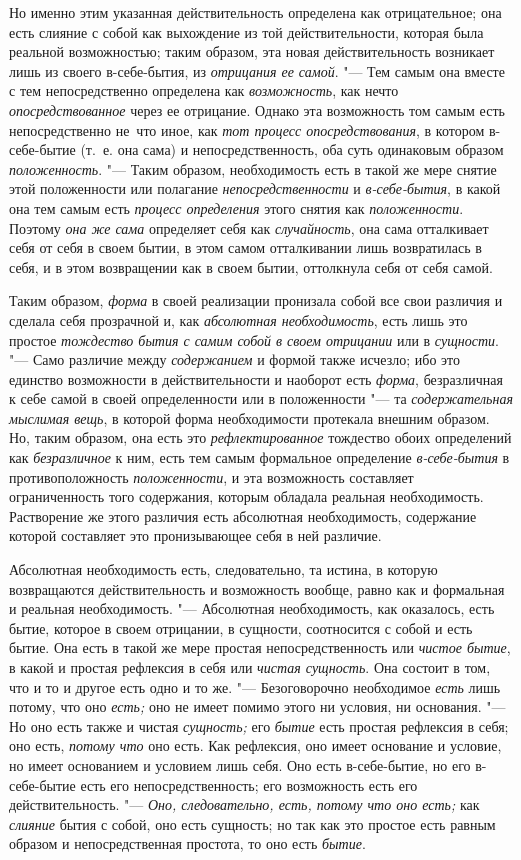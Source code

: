 Но именно этим указанная действительность определена как отрицательное; она
есть слияние с собой как выхождение из той действительности, которая была
реальной возможностью; таким образом, эта новая действительность возникает
лишь из своего в-себе-бытия, из {\em отрицания ее
самой}. "--- Тем самым она вместе с тем непосредственно определена как
{\em возможность}, как нечто
{\em опосредствованное} через ее отрицание. Однако эта
возможность том самым есть непосредственно не~что иное, как
{\em тот процесс опосредствования}, в котором
в-себе-бытие (т.~е. она сама) и непосредственность, оба суть одинаковым
образом {\em положенность}. "--- Таким образом,
необходимость есть в такой же мере снятие этой положенности или полагание
{\em непосредственности} и
{\em в-себе-бытия}, в какой она тем самым есть
{\em процесс определения} этого снятия как
{\em положенности}. Поэтому
{\em она же сама} определяет себя как
{\em случайность}, она сама отталкивает себя от себя в
своем бытии, в этом самом отталкивании лишь возвратилась в себя, и в этом
возвращении как в своем бытии, оттолкнула себя от себя самой.

Таким образом, {\em форма} в своей реализации пронизала
собой все свои различия и сделала себя прозрачной и, как
{\em абсолютная необходимость}, есть лишь это простое
{\em тождество бытия с самим собой в своем отрицании}
или в {\em сущности}. "--- Само различие между
{\em содержанием} и формой также исчезло; ибо это
единство возможности в действительности и наоборот есть
{\em форма}, безразличная к себе самой в своей
определенности или в положенности "--- та
{\em содержательная мыслимая вещь}, в которой форма
необходимости протекала внешним образом. Но, таким образом, она есть это
{\em рефлектированное} тождество обоих определений как
{\em безразличное} к ним, есть тем самым формальное
определение {\em в-себе-бытия} в противоположность
{\em положенности}, и эта возможность составляет
ограниченность того содержания, которым обладала реальная необходимость.
Растворение же этого различия есть абсолютная необходимость, содержание
которой составляет это пронизывающее себя в ней различие.

Абсолютная необходимость есть, следовательно, та истина, в которую
возвращаются действительность и возможность вообще, равно как и формальная
и реальная необходимость. "--- Абсолютная необходимость, как оказалось, есть
бытие, которое в своем отрицании, в сущности, соотносится с собой и есть
бытие. Она есть в такой же мере простая непосредственность или
{\em чистое бытие}, в какой и простая рефлексия в себя
или {\em чистая сущность}. Она состоит в том, что и то
и другое есть одно и то же. "--- Безоговорочно необходимое
{\em есть} лишь потому, что оно
{\em есть;} оно не имеет помимо этого ни условия, ни
основания. "--- Но оно есть также и чистая {\em сущность;}
его {\em бытие} есть простая рефлексия в себя; оно
есть, {\em потому что} оно есть. Как рефлексия, оно
имеет основание и условие, но имеет основанием и условием лишь себя. Оно
есть в-себе-бытие, но его в-себе-бытие есть его непосредственность; его
возможность есть его действительность. "--- {\em Оно, следовательно, есть,
потому что оно есть;} как {\em слияние} бытия с собой, оно есть сущность; но
так как это простое есть равным образом и непосредственная простота, то оно
есть {\em бытие}.

